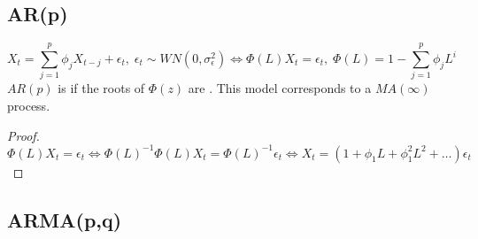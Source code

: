 \subsection{AR(p)}

\begin{equation*}
    X_t = \sum_{j=1}^{p}\phi_j X_{t-j}+\epsilon_t,\;\epsilon_t\sim WN(0,\sigma^2_{\epsilon}) 
    \Leftrightarrow \Phi(L)X_t = \epsilon_t,\; \Phi(L) = 1 - \sum_{j=1}^{p}\phi_j L^i
\end{equation*}
$AR(p)$ is  if the roots of $\Phi(z)$ are .
This model corresponds to a $MA(\infty)$ process.
\begin{proof}
    \begin{equation*}
        \Phi(L)X_t = \epsilon_t \Leftrightarrow \Phi(L)^{-1}\Phi(L)X_t = \Phi(L)^{-1}\epsilon_t\Leftrightarrow X_t = (1 + \phi_1L + \phi_1^2 L^2 +\ldots)\epsilon_t
    \end{equation*}
\end{proof}

\subsection{ARMA(p,q)}

